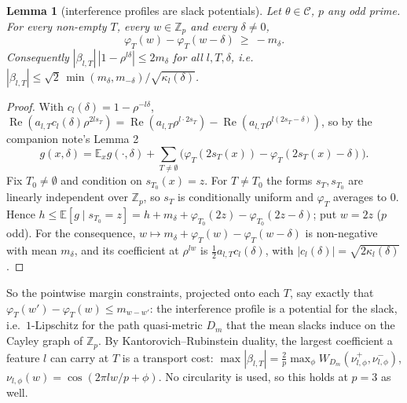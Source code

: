 \documentclass[11pt]{article}
\newtheorem{lemma}[theorem]{Lemma}
\theoremstyle{definition}
\renewcommand{\Re}{\operatorname{Re}}
\begin{document}
\begin{lemma}[interference profiles are slack potentials]\label{lem:potential}
Let $\theta\in\mathcal C$, $p$ any odd prime.  For every non-empty $T$, every $w\in\mathbb Z_p$ and every $\delta\ne0$,
\[\varphi_T(w)-\varphi_T(w-\delta)\ \ge\ -m_\delta .\]
Consequently $|\beta_{l,T}|\,|1-\rho^{l\delta}|\le2m_\delta$ for all $l,T,\delta$, i.e.\
$|\beta_{l,T}|\le\sqrt2\,\min(m_\delta,m_{-\delta})/\sqrt{\kappa_l(\delta)}$.
\end{lemma}
\begin{proof}
With $c_l(\delta)=1-\rho^{-l\delta}$,
$\Re(a_{l,T}c_l(\delta)\rho^{2ls_T})=\Re(a_{l,T}\rho^{l\cdot2s_T})-\Re(a_{l,T}\rho^{l(2s_T-\delta)})$, so by the
companion note's Lemma 2
\[g(x,\delta)=\mathbb E_xg(\cdot,\delta)+\sum_{T\ne\emptyset}\big(\varphi_T(2s_T(x))-\varphi_T(2s_T(x)-\delta)\big).\]
Fix $T_0\ne\emptyset$ and condition on $s_{T_0}(x)=z$.  For $T\ne T_0$ the forms $s_T,s_{T_0}$ are linearly independent
over $\mathbb Z_p$, so $s_T$ is conditionally uniform and $\varphi_T$ averages to $0$.  Hence
$h\le\mathbb E[g\mid s_{T_0}=z]=h+m_\delta+\varphi_{T_0}(2z)-\varphi_{T_0}(2z-\delta)$; put $w=2z$ ($p$ odd).  For the
consequence, $w\mapsto m_\delta+\varphi_T(w)-\varphi_T(w-\delta)$ is non-negative with mean $m_\delta$, and its coefficient at
$\rho^{lw}$ is $\frac12a_{l,T}c_l(\delta)$, with $|c_l(\delta)|=\sqrt{2\kappa_l(\delta)}$.
\end{proof}
So the pointwise margin constraints, projected onto each $T$, say exactly that $\varphi_T(w')-\varphi_T(w)\le m_{w-w'}$: the
interference profile is a potential for the slack, i.e.\ $1$-Lipschitz for the path quasi-metric $D_m$ that the mean
slacks induce on the Cayley graph of $\mathbb Z_p$.  By Kantorovich--Rubinstein duality, the largest coefficient a
feature $l$ can carry at $T$ is a transport cost: $\max|\beta_{l,T}|=\frac2p\max_\phi W_{D_m}(\nu^+_{l,\phi},\nu^-_{l,\phi})$,
$\nu_{l,\phi}(w)=\cos(2\pi lw/p+\phi)$.  No circularity is used, so this holds at $p=3$ as well.
\end{document}
